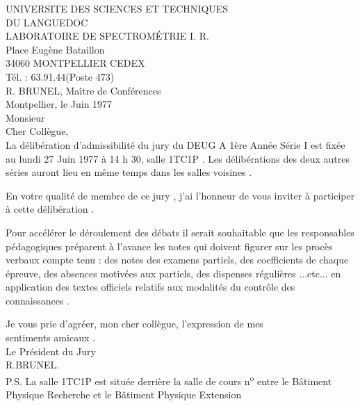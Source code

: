 
UNIVERSITE DES SCIENCES ET TECHNIQUES\\
DU LANGUEDOC\\
LABORATOIRE DE SPECTROMÉTRIE I. R.\\
Place Eugène Bataillon\\
34060 MONTPELLIER CEDEX\\
Tél. : 63.91.44\quad (Poste 473)\\
R. BRUNEL, Maître de Conférences\\

Montpellier, le Juin 1977\\

Monsieur \\

Cher Collègue,\\

La délibération d'admissibilité du jury du DEUG A 1ère Année Série I est fixée au lundi 27 Juin 1977 à 14 h 30, salle 1TC1P . Les délibérations des deux autres séries auront lieu en même temps dans les salles voisines .

En votre qualité de membre de ce jury , j'ai l'honneur de vous inviter à participer à cette délibération .

Pour accélérer le déroulement des débats il serait souhaitable que les responsables pédagogiques préparent à l'avance les notes qui doivent figurer sur les procès verbaux compte tenu : des notes des examens partiels, des coefficients de chaque épreuve, des absences motivées aux partiels, des dispenses régulières ...etc... en application des textes officiels relatifs aux modalités du contrôle des connaissances .

Je vous prie d'agréer, mon cher collègue, l'expression de mes\\
sentiments amicaux .\\

Le Président du Jury\\
R.BRUNEL.\qquad{}\\

P.S. La salle 1TC1P est située derrière la salle de cours n\textsuperscript{o}  entre le Bâtiment Physique Recherche et le Bâtiment Physique Extension
